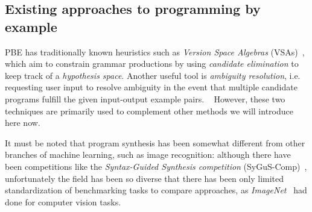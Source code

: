 \documentclass{article}
\begin{document}

\subsection{Existing approaches to programming by example} \label{sec:pbe}

PBE has traditionally known heuristics such as
\emph{Version Space Algebras} (VSAs)~\citep{mitchell1982generalization},
which aim to constrain grammar productions by using
\emph{candidate elimination} to keep track of a \emph{hypothesis space}.
Another useful tool is \emph{ambiguity resolution},
i.e. requesting user input to resolve ambiguity
in the event that multiple candidate programs
fulfill the given input-output example pairs.%
~\citep{gulwani2017program}
However,
these two techniques are primarily used to complement
other methods we will introduce here now.

It must be noted that program synthesis has been somewhat different
from other branches of machine learning, such as image recognition:
although there have been competitions like the
\emph{Syntax-Guided Synthesis competition} (SyGuS-Comp)~\citep{sygus},
unfortunately the field has been so diverse that there has been only limited
standardization of benchmarking tasks to compare approaches,
as \emph{ImageNet}~\citep{deng2009imagenet} had done for computer vision tasks.%
\end{document}
